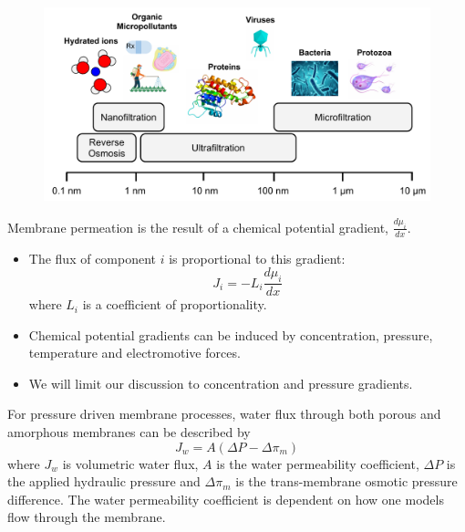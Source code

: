   \begin{figure}
  \centering
  \includegraphics[width=\textwidth]{figs/membrane_separation_size_regimes.pdf}
  \caption{}\label{fig:size_regimes}
  \end{figure}
  
  \noindent Membrane permeation is the result of a chemical potential gradient, $\frac{d\mu_i}{dx}$.
  \begin{itemize}
	  \item The flux of component $i$ is proportional to this gradient:
	  \begin{equation}
	    J_i = -L_i \frac{d\mu_i}{dx}
	  \end{equation}
	  where $L_i$ is a coefficient of proportionality.~\cite{wijmans_solution-diffusion_1995}
	  \item Chemical potential gradients can be induced by concentration, pressure, 
	  temperature and electromotive forces.
	  \item We will limit our discussion to concentration and pressure gradients.
  \end{itemize}
  
  For pressure driven membrane processes, water flux through both porous and 
  amorphous membranes can be described by
  \begin{equation}
  J_w = A(\Delta P - \Delta \pi_m)
  \end{equation}
  where $J_w$ is volumetric water flux, $A$ is the water permeability coefficient,
  $\Delta P$ is the applied hydraulic pressure and $\Delta \pi_m$ is the 
  trans-membrane osmotic pressure difference. The water permeability coefficient
  is dependent on how one models flow through the membrane.
  
